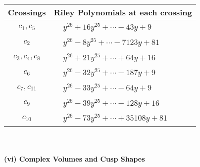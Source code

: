 \documentclass[1p]{elsarticle_modified}
\theoremstyle{definition}
\begin{document}
\begin{tabular}{m{50pt}|m{274pt}}
Crossings & \hspace{64pt}Riley Polynomials at each crossing \\
\hline $$\begin{aligned}c_{1},c_{5}\end{aligned}$$&$\begin{aligned}
&y^{26}+16 y^{25}+\cdots-43 y+9
\end{aligned}$\\
\hline $$\begin{aligned}c_{2}\end{aligned}$$&$\begin{aligned}
&y^{26}-8 y^{25}+\cdots-7123 y+81
\end{aligned}$\\
\hline $$\begin{aligned}c_{3},c_{4},c_{8}\end{aligned}$$&$\begin{aligned}
&y^{26}+21 y^{25}+\cdots+64 y+16
\end{aligned}$\\
\hline $$\begin{aligned}c_{6}\end{aligned}$$&$\begin{aligned}
&y^{26}-32 y^{25}+\cdots-187 y+9
\end{aligned}$\\
\hline $$\begin{aligned}c_{7},c_{11}\end{aligned}$$&$\begin{aligned}
&y^{26}-33 y^{25}+\cdots-64 y+9
\end{aligned}$\\
\hline $$\begin{aligned}c_{9}\end{aligned}$$&$\begin{aligned}
&y^{26}-39 y^{25}+\cdots-128 y+16
\end{aligned}$\\
\hline $$\begin{aligned}c_{10}\end{aligned}$$&$\begin{aligned}
&y^{26}-73 y^{25}+\cdots+35108 y+81
\end{aligned}$\\
\hline
\end{tabular}\\~\\
\newpage\flushleft \textbf{(vi) Complex Volumes and Cusp Shapes}
\end{document}

